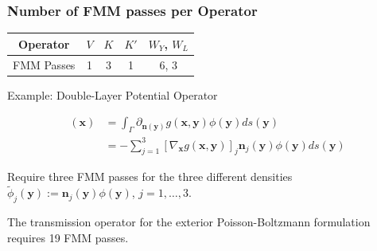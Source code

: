\documentclass[dvipsnames,10pt]{beamer}
\begin{document}
\begin{frame}
    \frametitle{Number of FMM passes per Operator}

    \begin{tabular}{c|c|c|c|c}
        Operator & $V$ & $K$ & $K'$ & $W_Y$, $W_L$ \\
        \hline
        FMM Passes & 1 & 3 & 1 & 6, 3 
    \end{tabular}

    \vspace{.5cm}

    Example: Double-Layer Potential Operator

    \begin{align}
        [K\phi](\mathbf{x}) &= \int_{\Gamma}
        \partial_{\mathbf{n(\mathbf{y})}}g(\mathbf{x}, 
        \mathbf{y})\phi(\mathbf{y})ds(\mathbf{y})\nonumber \\
        &= -\sum_{j=1}^3\left[\nabla_{\mathbf{x}} 
        g(\mathbf{x}, \mathbf{y})\right]_j\mathbf{n}_j(\mathbf{y})
        \phi(\mathbf{y})ds(\mathbf{y})\nonumber
\end{align}

Require three FMM passes for the three different densities $\tilde{\phi}_j(\mathbf{y}):=\mathbf{n}_j(\mathbf{y})\phi(\mathbf{y})$, $j=1,\dots, 3$.

\vspace{.5cm}

The transmission operator for the exterior Poisson-Boltzmann formulation requires {\color{red} 19 FMM passes}.

\end{frame}
\end{document}
